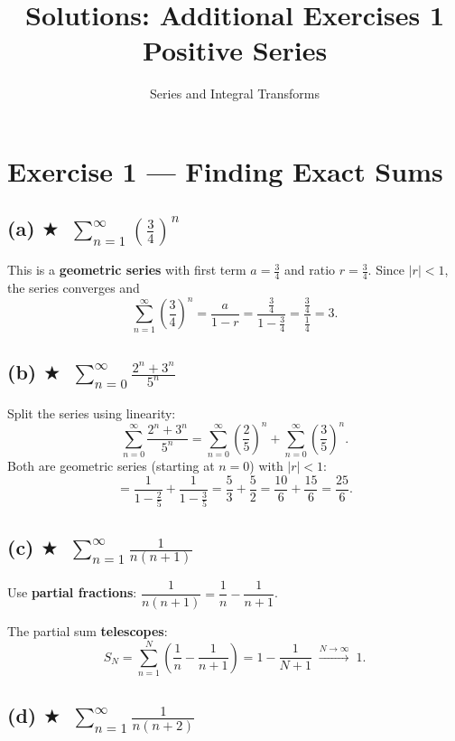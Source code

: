 \documentclass[12pt,a4paper]{article}
\title{\textbf{Solutions: Additional Exercises 1}\\Positive Series}
\author{Series and Integral Transforms}
\date{}
\newcommand{\easy}{\textcolor{green!60!black}{$\bigstar$}}
\begin{document}
\maketitle

\section*{Exercise 1 — Finding Exact Sums}

\subsection*{(a) \easy\ $\displaystyle\sum_{n=1}^{\infty}\left(\frac{3}{4}\right)^n$}

This is a \textbf{geometric series} with first term $a = \tfrac{3}{4}$ and ratio $r = \tfrac{3}{4}$.
Since $|r| < 1$, the series converges and
\[
  \sum_{n=1}^{\infty}\left(\frac{3}{4}\right)^n
  = \frac{a}{1-r}
  = \frac{\tfrac{3}{4}}{1 - \tfrac{3}{4}}
  = \frac{\tfrac{3}{4}}{\tfrac{1}{4}} = \boxed{3}.
\]

\subsection*{(b) \easy\ $\displaystyle\sum_{n=0}^{\infty}\frac{2^n+3^n}{5^n}$}

Split the series using linearity:
\[
  \sum_{n=0}^{\infty}\frac{2^n+3^n}{5^n}
  = \sum_{n=0}^{\infty}\left(\frac{2}{5}\right)^n + \sum_{n=0}^{\infty}\left(\frac{3}{5}\right)^n.
\]
Both are geometric series (starting at $n=0$) with $|r|<1$:
\[
  = \frac{1}{1-\tfrac{2}{5}} + \frac{1}{1-\tfrac{3}{5}}
  = \frac{5}{3} + \frac{5}{2}
  = \frac{10}{6}+\frac{15}{6} = \boxed{\frac{25}{6}}.
\]

\subsection*{(c) \easy\ $\displaystyle\sum_{n=1}^{\infty}\frac{1}{n(n+1)}$}

Use \textbf{partial fractions}: $\dfrac{1}{n(n+1)} = \dfrac{1}{n} - \dfrac{1}{n+1}$.

The partial sum \textbf{telescopes}:
\[
  S_N = \sum_{n=1}^{N}\left(\frac{1}{n}-\frac{1}{n+1}\right)
  = 1 - \frac{1}{N+1} \;\xrightarrow{N\to\infty}\; \boxed{1}.
\]

\subsection*{(d) \easy\ $\displaystyle\sum_{n=1}^{\infty}\frac{1}{n(n+2)}$}
\end{document}
